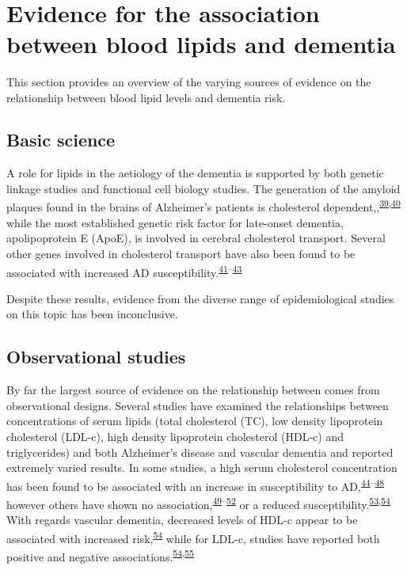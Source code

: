 \documentclass[a4paper, twoside]{templates/ociamthesis}
\begin{document}
~

\hypertarget{evidence-association}{%
\section{Evidence for the association between blood lipids and dementia}\label{evidence-association}}

This section provides an overview of the varying sources of evidence on the relationship between blood lipid levels and dementia risk.

\hypertarget{basic-science}{%
\subsection{Basic science}\label{basic-science}}

A role for lipids in the aetiology of the dementia is supported by both genetic linkage studies and functional cell biology studies. The generation of the amyloid plaques found in the brains of Alzheimer's patients is cholesterol dependent,,\textsuperscript{\protect\hyperlink{ref-burns2003}{39},\protect\hyperlink{ref-mizuno1999}{40}} while the most established genetic risk factor for late-onset dementia, apolipoprotein E (ApoE), is involved in cerebral cholesterol transport. Several other genes involved in cholesterol transport have also been found to be associated with increased AD susceptibility.\textsuperscript{\protect\hyperlink{ref-beecham2014}{41}--\protect\hyperlink{ref-meng2007}{43}}

Despite these results, evidence from the diverse range of epidemiological studies on this topic has been inconclusive.

\hypertarget{observational-studies}{%
\subsection{Observational studies}\label{observational-studies}}

By far the largest source of evidence on the relationship between comes from observational designs. Several studies have examined the relationships between concentrations of serum lipids (total cholesterol (TC), low density lipoprotein cholesterol (LDL-c), high density lipoprotein cholesterol (HDL-c) and triglycerides) and both Alzheimer's disease and vascular dementia and reported extremely varied results. In some studies, a high serum cholesterol concentration has been found to be associated with an increase in susceptibility to AD,\textsuperscript{\protect\hyperlink{ref-kivipelto2002}{44}--\protect\hyperlink{ref-whitmer2005}{48}} however others have shown no association,\textsuperscript{\protect\hyperlink{ref-li2005a}{49}--\protect\hyperlink{ref-tan2003a}{52}} or a reduced susceptibility.\textsuperscript{\protect\hyperlink{ref-mielke2005}{53},\protect\hyperlink{ref-reitz2004a}{54}} With regards vascular dementia, decreased levels of HDL-c appear to be associated with increased risk,\textsuperscript{\protect\hyperlink{ref-reitz2004a}{54}} while for LDL-c, studies have reported both positive and negative associations.\textsuperscript{\protect\hyperlink{ref-reitz2004a}{54},\protect\hyperlink{ref-moroney1999}{55}}
\end{document}
